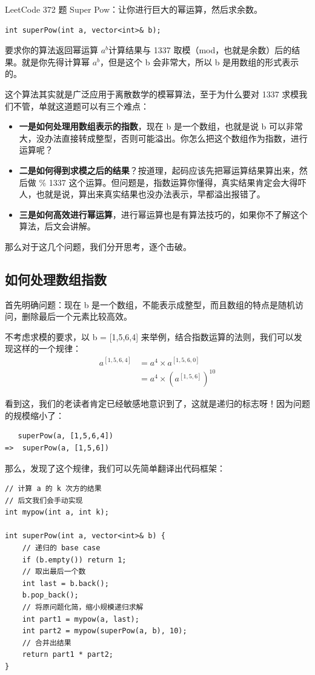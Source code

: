 \documentclass[12pt]{article}
\begin{document}
LeetCode 372 题 Super Pow：让你进行巨大的幂运算，然后求余数。
\begin{lstlisting}
int superPow(int a, vector<int>& b);
\end{lstlisting}

要求你的算法返回幂运算 $a^b$计算结果与 1337 取模（mod，也就是余数）后的结果。就是你先得计算幂 $a^b$，但是这个 b 会非常大，所以 b 是用数组的形式表示的。

这个算法其实就是广泛应用于离散数学的模幂算法，至于为什么要对 1337 求模我们不管，单就这道题可以有三个难点：
\begin{itemize}
\setlength{\itemsep}{0pt}
\setlength{\parsep}{0pt}
\setlength{\parskip}{0pt}
    \item \textbf{一是如何处理用数组表示的指数}，现在 b 是一个数组，也就是说 b 可以非常大，没办法直接转成整型，否则可能溢出。你怎么把这个数组作为指数，进行运算呢？

    \item \textbf{二是如何得到求模之后的结果}？按道理，起码应该先把幂运算结果算出来，然后做 \% 1337 这个运算。但问题是，指数运算你懂得，真实结果肯定会大得吓人，也就是说，算出来真实结果也没办法表示，早都溢出报错了。
    
    \item \textbf{三是如何高效进行幂运算}，进行幂运算也是有算法技巧的，如果你不了解这个算法，后文会讲解。
\end{itemize}

那么对于这几个问题，我们分开思考，逐个击破。

\subsection{如何处理数组指数}
首先明确问题：现在 b 是一个数组，不能表示成整型，而且数组的特点是随机访问，删除最后一个元素比较高效。

不考虑求模的要求，以 b = [1,5,6,4] 来举例，结合指数运算的法则，我们可以发现这样的一个规律：
\begin{align*}
a^{[1,5,6,4]} &= a^4 \times a^{[1,5,6,0]} \\
	&= a^4 \times (a^{[1,5,6]})^{10}
\end{align*}

看到这，我们的老读者肯定已经敏感地意识到了，这就是递归的标志呀！因为问题的规模缩小了：
\begin{lstlisting}
   superPow(a, [1,5,6,4])
=>  superPow(a, [1,5,6])
\end{lstlisting}

那么，发现了这个规律，我们可以先简单翻译出代码框架：
\begin{lstlisting}
// 计算 a 的 k 次方的结果
// 后文我们会手动实现
int mypow(int a, int k);

int superPow(int a, vector<int>& b) {
    // 递归的 base case
    if (b.empty()) return 1;
    // 取出最后一个数
    int last = b.back();
    b.pop_back();
    // 将原问题化简，缩小规模递归求解
    int part1 = mypow(a, last);
    int part2 = mypow(superPow(a, b), 10);
    // 合并出结果
    return part1 * part2;
}
\end{lstlisting}
\end{document}
